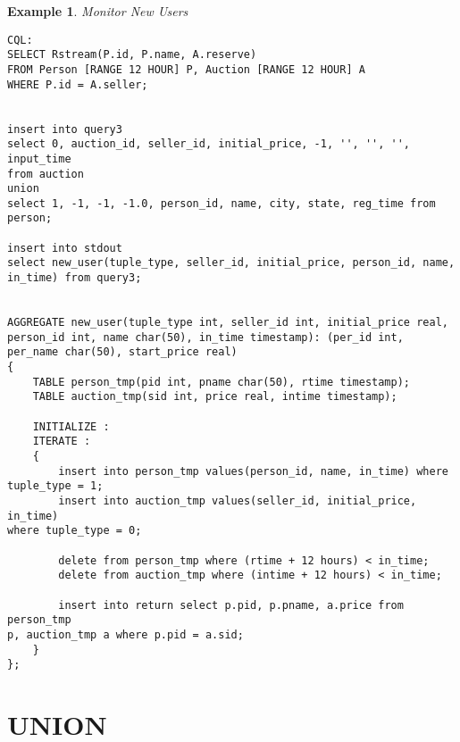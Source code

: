 \documentclass[10pt]{report}
\newtheorem{example}{Example}
\begin{document}
\begin{example}{Monitor New Users}\\
\begin{verbatim}
CQL:
SELECT Rstream(P.id, P.name, A.reserve)
FROM Person [RANGE 12 HOUR] P, Auction [RANGE 12 HOUR] A
WHERE P.id = A.seller;


insert into query3
select 0, auction_id, seller_id, initial_price, -1, '', '', '', input_time
from auction
union
select 1, -1, -1, -1.0, person_id, name, city, state, reg_time from
person;

insert into stdout
select new_user(tuple_type, seller_id, initial_price, person_id, name,
in_time) from query3;


AGGREGATE new_user(tuple_type int, seller_id int, initial_price real,
person_id int, name char(50), in_time timestamp): (per_id int, per_name char(50), start_price real)
{
    TABLE person_tmp(pid int, pname char(50), rtime timestamp);
    TABLE auction_tmp(sid int, price real, intime timestamp);

    INITIALIZE :
    ITERATE :
    {
        insert into person_tmp values(person_id, name, in_time) where
tuple_type = 1;
        insert into auction_tmp values(seller_id, initial_price, in_time)
where tuple_type = 0;

        delete from person_tmp where (rtime + 12 hours) < in_time;
        delete from auction_tmp where (intime + 12 hours) < in_time;

        insert into return select p.pid, p.pname, a.price from person_tmp
p, auction_tmp a where p.pid = a.sid;
    }
};

\end{verbatim}
\end{example}
\chapter{UNION}

%
{\renewcommand{\baselinestretch}{1.01}
  \small
    
}
\end{document}
